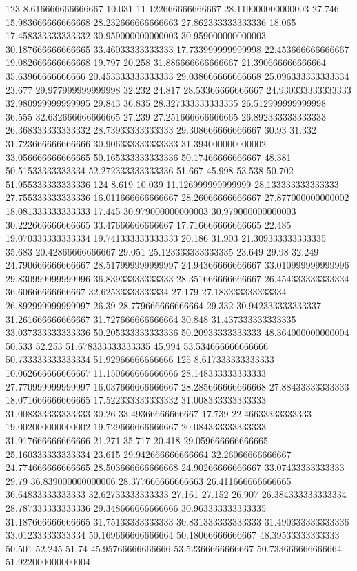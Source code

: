 123 8.616666666666667 10.031 11.122666666666667 28.119000000000003 27.746 15.983666666666668 28.232666666666663 27.862333333333336 18.065 17.458333333333332 30.959000000000003 30.959000000000003 30.187666666666665 33.46033333333333 17.733999999999998 22.453666666666667 19.082666666666668 19.797 20.258 31.886666666666667 21.390666666666664 35.63966666666666 20.453333333333333 29.038666666666668 25.096333333333334 23.677 29.977999999999998 32.232 24.817 28.53366666666667 24.930333333333333 32.980999999999995 29.843 36.835 28.327333333333335 26.512999999999998 36.555 32.632666666666665 27.239 27.251666666666665 26.892333333333333 26.368333333333332 28.73933333333333 29.308666666666667 30.93 31.332 31.723666666666666 30.906333333333333 31.394000000000002 33.056666666666665 50.165333333333336 50.17466666666667 48.381 50.51533333333334 52.272333333333336 51.667 45.998 53.538 50.702 51.955333333333336
124 8.619 10.039 11.126999999999999 28.133333333333333 27.755333333333336 16.011666666666667 28.26066666666667 27.877000000000002 18.081333333333333 17.445 30.979000000000003 30.979000000000003 30.222666666666665 33.47666666666667 17.716666666666665 22.485 19.070333333333334 19.741333333333333 20.186 31.903 21.309333333333335 35.683 20.42866666666667 29.051 25.123333333333335 23.649 29.98 32.249 24.790666666666667 28.517999999999997 24.94366666666667 33.010999999999996 29.830999999999996 36.83933333333333 28.351666666666667 26.454333333333334 36.60666666666667 32.62533333333334 27.179 27.183333333333334 26.892999999999997 26.39 28.779666666666664 29.332 30.942333333333337 31.261666666666667 31.727666666666664 30.848 31.437333333333335 33.037333333333336 50.205333333333336 50.20933333333333 48.364000000000004 50.533 52.253 51.678333333333335 45.994 53.534666666666666 50.733333333333334 51.92966666666666
125 8.617333333333333 10.062666666666667 11.150666666666666 28.148333333333333 27.770999999999997 16.037666666666667 28.285666666666668 27.88433333333333 18.071666666666665 17.522333333333332 31.008333333333333 31.008333333333333 30.26 33.49366666666667 17.739 22.46633333333333 19.002000000000002 19.729666666666667 20.084333333333333 31.917666666666666 21.271 35.717 20.418 29.059666666666665 25.160333333333334 23.615 29.942666666666664 32.26066666666667 24.774666666666665 28.503666666666668 24.90266666666667 33.07433333333333 29.79 36.839000000000006 28.377666666666663 26.411666666666665 36.64833333333333 32.62733333333333 27.161 27.152 26.907 26.384333333333334 28.787333333333336 29.348666666666666 30.963333333333335 31.187666666666665 31.75133333333333 30.831333333333333 31.490333333333336 33.01233333333334 50.169666666666664 50.18066666666667 48.39533333333333 50.501 52.245 51.74 45.95766666666666 53.52366666666667 50.733666666666664 51.922000000000004
